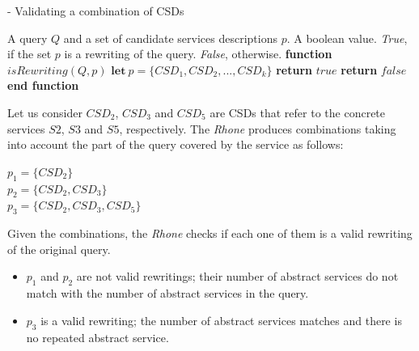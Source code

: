 \begin{algorithm}[h!]
\caption{ - Validating a combination of CSDs}
\label{isrewriting}
\begin{algorithmic}[1]
\REQUIRE A query $Q$ and a set of candidate services descriptions $p$.
\ENSURE A boolean value. \textit{True}, if the set $p$ is a rewriting of the query. \textit{False}, otherwise.
\STATE \textbf{function} $\mathit{isRewriting} (Q, p)$
\STATE  $\mathbf{let} \ p = \lbrace CSD_{1}, CSD_{2}, ..., CSD_{k} \rbrace$
	\STATE \textbf{return} $true$		
\ENDIF
\STATE \textbf{return} $false$
\STATE \textbf{end function}
\end{algorithmic}
\end{algorithm}

Let us consider $CSD_{2}$, $CSD_{3}$ and $CSD_{5}$ are CSDs that refer to the concrete services $S2$, $S3$ and $S5$, respectively. The \textit{Rhone} produces combinations taking into account the part of the query covered by the service as follows:
\begin{flushleft}
$p_{1} = \lbrace CSD_{2} \rbrace$ \\
$p_{2} = \lbrace CSD_{2}, CSD_{3} \rbrace$ \\
$p_{3} = \lbrace CSD_{2}, CSD_{3}, CSD_{5} \rbrace$
\end{flushleft}
Given the combinations, the \textit{Rhone} checks if each one of them is a valid
rewriting of the original query.
\begin{itemize}
\item $p_{1}$ and $p_{2}$ are not valid rewritings; their number of abstract services do not match with the number of abstract services in the query.
\item $p_{3}$ is a valid rewriting; the number of abstract services matches and there is no repeated abstract service. 
\end{itemize}

